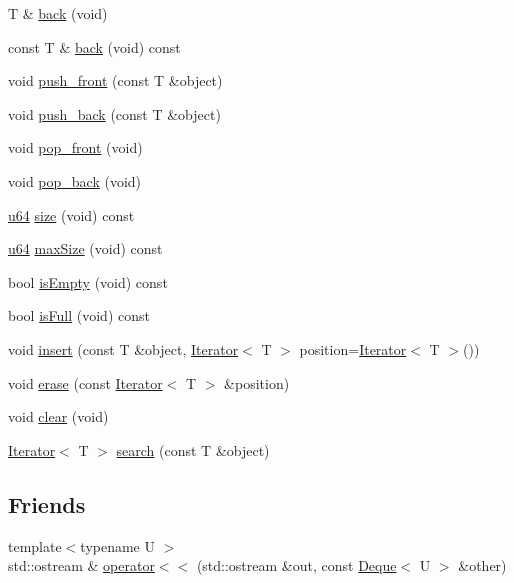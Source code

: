 \begin{DoxyCompactItemize}
\item 
T \& \hyperlink{classcrap_1_1container_1_1_deque_a4c57aa7f28b4864a66bf9c01b8730186}{back} (void)
\item 
const T \& \hyperlink{classcrap_1_1container_1_1_deque_ac76054fa686a7483ee52369a1f889997}{back} (void) const 
\item 
void \hyperlink{classcrap_1_1container_1_1_deque_ab65a41294d1f911a265f39f389f131b3}{push\-\_\-front} (const T \&object)
\item 
void \hyperlink{classcrap_1_1container_1_1_deque_aff97b8af994bfb403de8c7c05f71e034}{push\-\_\-back} (const T \&object)
\item 
void \hyperlink{classcrap_1_1container_1_1_deque_a0a4699d6174ae10cd22b58e8523c8b9b}{pop\-\_\-front} (void)
\item 
void \hyperlink{classcrap_1_1container_1_1_deque_a096a1ffb1aa87c7b6b5e21e22756b8b4}{pop\-\_\-back} (void)
\item 
\hyperlink{types_8h_a3f7e2bcbb0b4c338f3c4f6c937cd4234}{u64} \hyperlink{classcrap_1_1container_1_1_deque_adb4e1bbbe6dd2d0aefde481e6840cc6c}{size} (void) const 
\item 
\hyperlink{types_8h_a3f7e2bcbb0b4c338f3c4f6c937cd4234}{u64} \hyperlink{classcrap_1_1container_1_1_deque_aca9adc5e1c43416118052aa489b7696b}{max\-Size} (void) const 
\item 
bool \hyperlink{classcrap_1_1container_1_1_deque_ada910d538e236ca4a0967cfc89366fcf}{is\-Empty} (void) const 
\item 
bool \hyperlink{classcrap_1_1container_1_1_deque_a09e7a4c1d549fc7a531466a7cf84e558}{is\-Full} (void) const 
\item 
void \hyperlink{classcrap_1_1container_1_1_deque_ab732b59c393e7f2e05b0e9ece67a0097}{insert} (const T \&object, \hyperlink{class_iterator}{Iterator}$<$ T $>$ position=\hyperlink{class_iterator}{Iterator}$<$ T $>$())
\item 
void \hyperlink{classcrap_1_1container_1_1_deque_a36bb12d5304c40499f748e6dc46db4ae}{erase} (const \hyperlink{class_iterator}{Iterator}$<$ T $>$ \&position)
\item 
void \hyperlink{classcrap_1_1container_1_1_deque_a4cfcfaa143fc1dce1224fe2c987df2f8}{clear} (void)
\item 
\hyperlink{class_iterator}{Iterator}$<$ T $>$ \hyperlink{classcrap_1_1container_1_1_deque_a044530c2f5c4aa1687f8acc3a488fe41}{search} (const T \&object)
\end{DoxyCompactItemize}
\subsection*{Friends}
\begin{DoxyCompactItemize}
\item 
{\footnotesize template$<$typename U $>$ }\\std\-::ostream \& \hyperlink{classcrap_1_1container_1_1_deque_a8e6cfce07fe22e13a0454478fdbb5501}{operator$<$$<$} (std\-::ostream \&out, const \hyperlink{classcrap_1_1container_1_1_deque}{Deque}$<$ U $>$ \&other)
\end{DoxyCompactItemize}


